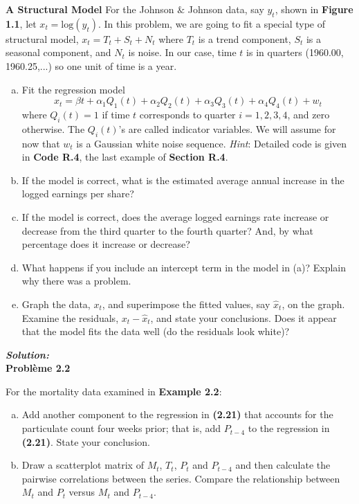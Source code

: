 \documentclass{homework}
\begin{document}
\textbf{A Structural Model} For the Johnson $\&$ Johnson data, say $y_t$, shown in \textbf{Figure 1.1}, let $x_t = \text{log}(y_t)$. In this problem, we are going to fit a special type of structural model, $x_t = T_t + S_t + N_t$ where $T_t$ is a trend component, $S_t$ is a seasonal component, and $N_t$ is noise. In our case, time $t$ is in quarters (1960.00, 1960.25,...) so one unit of time is a year.
\begin{enumerate}[(a)]
    \item Fit the regression model
    $$x_t = \beta t+\alpha_1Q_1(t)+\alpha_2Q_2(t)+\alpha_3Q_3(t)+\alpha_4Q_4(t)+w_t$$
    where $Q_i(t) = 1$ if time $t$ corresponds to quarter $i = 1,2,3,4$, and zero otherwise. The $Q_i(t)$’s are called indicator variables. We will assume for now that $w_t$ is a Gaussian white noise sequence. \textit{Hint}: Detailed code is given in \textbf{Code R.4}, the last example of \textbf{Section R.4}.
    \item If the model is correct, what is the estimated average annual increase in the logged earnings per share?
    \item If the model is correct, does the average logged earnings rate increase or decrease from the third quarter to the fourth quarter? And, by what percentage does it increase or decrease?
    \item What happens if you include an intercept term in the model in (a)? Explain why there was a problem.
    \item Graph the data, $x_t$, and superimpose the fitted values, say $\hat{x}_t$, on the graph. Examine the residuals, $x_t-\hat{x}_t$, and state your conclusions. Does it appear that the model fits the data well (do the residuals look white)?\\
\end{enumerate}

\textit{\textbf{Solution:}}\\


\newpage
\textbf{\Large{Problème 2.2}}

For the mortality data examined in \textbf{Example 2.2}:
\begin{enumerate}[(a)]
    \item Add another component to the regression in \textbf{(2.21)} that accounts for the particulate count four weeks prior; that is, add $P_{t-4}$ to the regression in \textbf{(2.21)}. State your conclusion.
    \item Draw a scatterplot matrix of $M_t$, $T_t$, $P_t$ and $P_{t-4}$ and then calculate the pairwise correlations between the series. Compare the relationship between $M_t$ and $P_t$ versus $M_t$ and $P_{t-4}$.\\
\end{enumerate}
\end{document}

